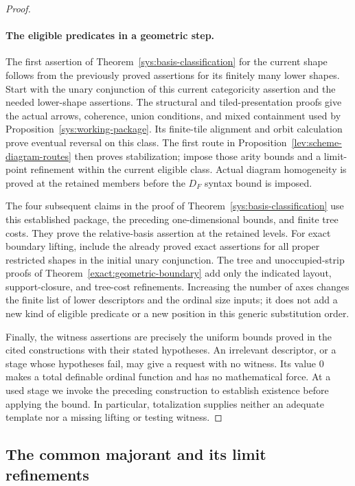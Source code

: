 \begin{proof}
\paragraph{The eligible predicates in a geometric step.}
The first assertion of Theorem~\ref{sys:basis-classification} for the
current shape follows from the previously proved assertions for its
finitely many lower shapes.  Start with the unary conjunction of this
current categoricity assertion and the needed lower-shape assertions.
The structural and tiled-presentation proofs give the actual arrows,
coherence, union conditions, and mixed containment used by
Proposition~\ref{sys:working-package}.  Its finite-tile alignment and
orbit calculation prove eventual reversal on this class.  The first
route in Proposition~\ref{lev:scheme-diagram-routes} then proves
stabilization; impose those arity bounds and a limit-point refinement
within the current eligible class.  Actual diagram homogeneity is
proved at the retained members before the $D_F$ syntax bound is imposed.

The four subsequent claims in the proof of
Theorem~\ref{sys:basis-classification} use this established package,
the preceding one-dimensional bounds, and finite tree costs.  They
prove the relative-basis assertion at the retained levels.
For exact boundary lifting, include the already proved exact assertions
for all proper restricted shapes in the initial unary conjunction.
The tree and unoccupied-strip proofs of
Theorem~\ref{exact:geometric-boundary} add only the indicated layout,
support-closure, and tree-cost refinements.  Increasing the number of
axes changes the finite list of lower descriptors and the ordinal
size inputs; it does not add a new kind of eligible predicate or a new
position in this generic substitution order.

Finally, the witness assertions are precisely the uniform bounds proved
in the cited constructions with their stated hypotheses.  An irrelevant
descriptor, or a stage whose hypotheses fail, may give a request with
no witness.  Its value $0$ makes a total definable ordinal function and
has no mathematical force.  At a used stage we invoke the preceding
construction to establish existence before applying the bound.  In
particular, totalization supplies neither an adequate template nor a
missing lifting or testing witness.
\end{proof}

\subsection{The common majorant and its limit refinements}

